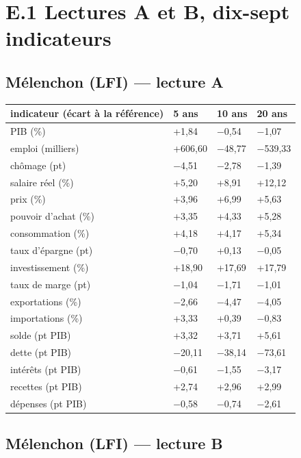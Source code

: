 \documentclass[
  11pt,
  11pt,
  a4paper,
  openany]{book}
\begin{document}
\hypertarget{e.1-lectures-a-et-b-dix-sept-indicateurs}{%
\section{E.1 Lectures A et B, dix-sept
indicateurs}\label{e.1-lectures-a-et-b-dix-sept-indicateurs}}

\hypertarget{muxe9lenchon-lfi-lecture-a}{%
\subsection{Mélenchon (LFI) --- lecture
A}\label{muxe9lenchon-lfi-lecture-a}}

\begin{longtable}[]{@{}llll@{}}
\toprule\noalign{}
indicateur (écart à la référence) & 5 ans & 10 ans & 20 ans \\
\midrule\noalign{}
\endhead
\bottomrule\noalign{}
\endlastfoot
PIB (\%) & +1,84 & −0,54 & −1,07 \\
emploi (milliers) & +606,60 & −48,77 & −539,33 \\
chômage (pt) & −4,51 & −2,78 & −1,39 \\
salaire réel (\%) & +5,20 & +8,91 & +12,12 \\
prix (\%) & +3,96 & +6,99 & +5,63 \\
pouvoir d'achat (\%) & +3,35 & +4,33 & +5,28 \\
consommation (\%) & +4,18 & +4,17 & +5,34 \\
taux d'épargne (pt) & −0,70 & +0,13 & −0,05 \\
investissement (\%) & +18,90 & +17,69 & +17,79 \\
taux de marge (pt) & −1,04 & −1,71 & −1,01 \\
exportations (\%) & −2,66 & −4,47 & −4,05 \\
importations (\%) & +3,33 & +0,39 & −0,83 \\
solde (pt PIB) & +3,32 & +3,71 & +5,61 \\
dette (pt PIB) & −20,11 & −38,14 & −73,61 \\
intérêts (pt PIB) & −0,61 & −1,55 & −3,17 \\
recettes (pt PIB) & +2,74 & +2,96 & +2,99 \\
dépenses (pt PIB) & −0,58 & −0,74 & −2,61 \\
\end{longtable}

\hypertarget{muxe9lenchon-lfi-lecture-b}{%
\subsection{Mélenchon (LFI) --- lecture
B}\label{muxe9lenchon-lfi-lecture-b}}
\end{document}

